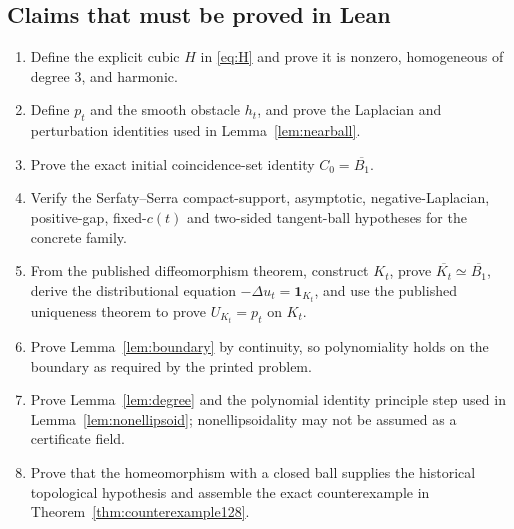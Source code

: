 \documentclass[11pt]{article}
\theoremstyle{definition}
\theoremstyle{remark}
\newcommand{\lap}{\Delta}
\newcommand{\1}{\mathbf{1}}
\begin{document}
\subsection*{Claims that must be proved in Lean}
\begin{enumerate}[label=\textbf{L128.\arabic*.}]
\item Define the explicit cubic $H$ in \eqref{eq:H} and prove it is nonzero, homogeneous of degree $3$, and harmonic.
\item Define $p_t$ and the smooth obstacle $h_t$, and prove the Laplacian and perturbation identities used in Lemma~\ref{lem:nearball}.
\item Prove the exact initial coincidence-set identity $C_0=\overline{B_1}$.
\item Verify the Serfaty--Serra compact-support, asymptotic, negative-Laplacian, positive-gap, fixed-$c(t)$ and two-sided tangent-ball hypotheses for the concrete family.
\item From the published diffeomorphism theorem, construct $K_t$, prove $\overline{K_t}\simeq\overline{B_1}$, derive the distributional equation $-\lap u_t=\1_{K_t}$, and use the published uniqueness theorem to prove $U_{K_t}=p_t$ on $K_t$.
\item Prove Lemma~\ref{lem:boundary} by continuity, so polynomiality holds on the boundary as required by the printed problem.
\item Prove Lemma~\ref{lem:degree} and the polynomial identity principle step used in Lemma~\ref{lem:nonellipsoid}; nonellipsoidality may not be assumed as a certificate field.
\item Prove that the homeomorphism with a closed ball supplies the historical topological hypothesis and assemble the exact counterexample in Theorem~\ref{thm:counterexample128}.
\end{enumerate}
\end{document}
